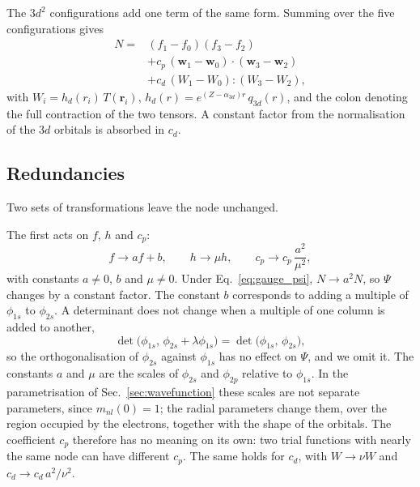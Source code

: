 \documentclass[aps,prb,reprint,amsmath,amssymb,superscriptaddress,nofootinbib]{revtex4-2}
\begin{document}
The $3d^2$ configurations add one term of the same form. Summing over the
five configurations gives
\begin{equation}
\begin{aligned}
    N = {} & (f_1 - f_0)(f_3 - f_2) \\
      & + c_p\, (\mathbf{w}_1 - \mathbf{w}_0) \cdot (\mathbf{w}_3 - \mathbf{w}_2) \\
      & + c_d\, (W_1 - W_0) : (W_3 - W_2) ,
\end{aligned}
    \label{eq:N_d}
\end{equation}
with $W_i = h_d(r_i)\, T(\mathbf{r}_i)$,
$h_d(r) = e^{(Z - \alpha_{3d}) r}\, q_{3d}(r)$, and the colon denoting the full
contraction of the two tensors. A constant factor from the normalisation of
the $3d$ orbitals is absorbed in $c_d$.

\subsection{Redundancies}
\label{ssec:redundancies}

Two sets of transformations leave the node unchanged.

The first acts on $f$, $h$ and $c_p$:
\begin{equation}
    f \to a f + b , \qquad
    h \to \mu h , \qquad
    c_p \to c_p\, \frac{a^2}{\mu^2} ,
    \label{eq:gauge_psi}
\end{equation}
with constants $a \neq 0$, $b$ and $\mu \neq 0$. Under
Eq.~\eqref{eq:gauge_psi}, $N \to a^2 N$, so $\Psi$ changes by a constant
factor. The constant $b$ corresponds to adding a multiple of $\phi_{1s}$ to
$\phi_{2s}$. A determinant does not change when a multiple of one column is
added to another,
\begin{equation}
    \det\bigl(\phi_{1s},\, \phi_{2s} + \lambda\phi_{1s}\bigr)
    = \det\bigl(\phi_{1s},\, \phi_{2s}\bigr) ,
    \label{eq:column_invariance}
\end{equation}
so the orthogonalisation of $\phi_{2s}$ against $\phi_{1s}$ has no effect on
$\Psi$, and we omit it. The constants $a$ and $\mu$ are the scales of
$\phi_{2s}$ and $\phi_{2p}$ relative to $\phi_{1s}$. In the parametrisation of
Sec.~\ref{sec:wavefunction} these scales are not separate parameters, since
$m_{nl}(0) = 1$; the radial parameters change them, over the region occupied
by the electrons, together with the shape of the orbitals. The coefficient
$c_p$ therefore has no meaning on its own: two trial functions with nearly the
same node can have different $c_p$. The same holds for $c_d$, with
$W \to \nu W$ and $c_d \to c_d\, a^2/\nu^2$.
\end{document}
